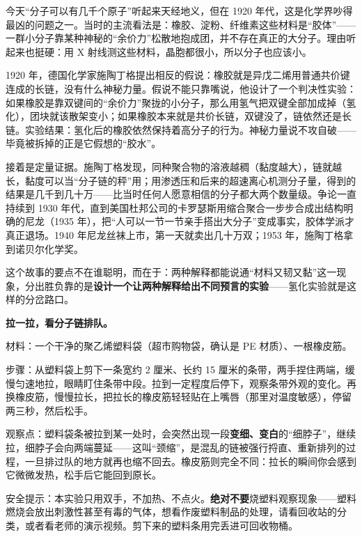 \begin{zhengju}
今天“分子可以有几千个原子”听起来天经地义，但在 1920 年代，这是化学界吵得最凶的问题之一。当时的主流看法是：橡胶、淀粉、纤维素这些材料是“胶体”——一群小分子靠某种神秘的“余价力”松散地抱成团，并不存在真正的大分子。理由听起来也挺硬：用 X 射线测这些材料，晶胞都很小，所以分子也应该小。

1920 年，德国化学家施陶丁格提出相反的假说：橡胶就是异戊二烯用普通共价键连成的长链，没有什么神秘力量。假说不能只靠嘴说，他设计了一个判决性实验：如果橡胶是靠双键间的“余价力”聚拢的小分子，那么用氢气把双键全部加成掉（氢化），团块就该散架变小；如果橡胶本来就是共价长链，双键没了，链依然还是长链。实验结果：氢化后的橡胶依然保持着高分子的行为。神秘力量说不攻自破——毕竟被拆掉的正是它假想的“胶水”。

接着是定量证据。施陶丁格发现，同种聚合物的溶液越稠（黏度越大），链就越长，黏度可以当“分子链的秤”用；用渗透压和后来的超速离心机测分子量，得到的结果是几千到几十万——比当时任何人愿意相信的分子都大两个数量级。争论一直持续到 1930 年代，直到美国杜邦公司的卡罗瑟斯用缩合聚合一步步合成出结构明确的尼龙（1935 年），把“人可以一节一节亲手搭出大分子”变成事实，胶体学派才真正退场。1940 年尼龙丝袜上市，第一天就卖出几十万双；1953 年，施陶丁格拿到诺贝尔化学奖。

这个故事的要点不在谁聪明，而在于：两种解释都能说通“材料又韧又黏”这一现象，分出胜负靠的是\textbf{设计一个让两种解释给出不同预言的实验}——氢化实验就是这样的分岔路口。
\end{zhengju}

\begin{shiyan}
\textbf{拉一拉，看分子链排队。}

材料：一个干净的聚乙烯塑料袋（超市购物袋，确认是 PE 材质）、一根橡皮筋。

步骤：从塑料袋上剪下一条宽约 2 厘米、长约 15 厘米的条带，两手捏住两端，缓慢匀速地拉，眼睛盯住条带中段。拉到一定程度后停下，观察条带外观的变化。再换橡皮筋，慢慢拉长，把拉长的橡皮筋轻轻贴在上嘴唇（那里对温度敏感），停留两三秒，然后松手。

观察点：塑料袋条被拉到某一处时，会突然出现一段\textbf{变细、变白}的“细脖子”，继续拉，细脖子会向两端蔓延——这叫“颈缩”，是混乱的链被强行捋直、重新排列的过程，一旦排过队的地方就再也缩不回去。橡皮筋则完全不同：拉长的瞬间你会感到它微微发热，松手后它能回到原长。

安全提示：本实验只用双手，不加热、不点火。\textbf{绝对不要}烧塑料观察现象——塑料燃烧会放出刺激性甚至有毒的气体，想看作废塑料制品的处理，请看回收站的分类，或者看老师的演示视频。剪下来的塑料条用完丢进可回收物桶。
\end{shiyan}

